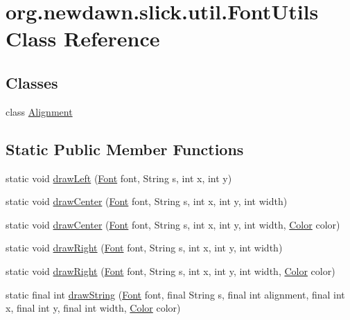 \hypertarget{classorg_1_1newdawn_1_1slick_1_1util_1_1_font_utils}{}\section{org.\+newdawn.\+slick.\+util.\+Font\+Utils Class Reference}
\label{classorg_1_1newdawn_1_1slick_1_1util_1_1_font_utils}
\subsection*{Classes}
\begin{DoxyCompactItemize}
\item 
class \mbox{\hyperlink{classorg_1_1newdawn_1_1slick_1_1util_1_1_font_utils_1_1_alignment}{Alignment}}
\end{DoxyCompactItemize}
\subsection*{Static Public Member Functions}
\begin{DoxyCompactItemize}
\item 
static void \mbox{\hyperlink{classorg_1_1newdawn_1_1slick_1_1util_1_1_font_utils_a3d08db123e5255022cc604309e93cb52}{draw\+Left}} (\mbox{\hyperlink{interfaceorg_1_1newdawn_1_1slick_1_1_font}{Font}} font, String s, int x, int y)
\item 
static void \mbox{\hyperlink{classorg_1_1newdawn_1_1slick_1_1util_1_1_font_utils_aa150b527895846f84f99c01abcac007d}{draw\+Center}} (\mbox{\hyperlink{interfaceorg_1_1newdawn_1_1slick_1_1_font}{Font}} font, String s, int x, int y, int width)
\item 
static void \mbox{\hyperlink{classorg_1_1newdawn_1_1slick_1_1util_1_1_font_utils_af6cd816a074ebf194f0a50de137d895a}{draw\+Center}} (\mbox{\hyperlink{interfaceorg_1_1newdawn_1_1slick_1_1_font}{Font}} font, String s, int x, int y, int width, \mbox{\hyperlink{classorg_1_1newdawn_1_1slick_1_1_color}{Color}} color)
\item 
static void \mbox{\hyperlink{classorg_1_1newdawn_1_1slick_1_1util_1_1_font_utils_a4d6971df637befd431907958aeb8d113}{draw\+Right}} (\mbox{\hyperlink{interfaceorg_1_1newdawn_1_1slick_1_1_font}{Font}} font, String s, int x, int y, int width)
\item 
static void \mbox{\hyperlink{classorg_1_1newdawn_1_1slick_1_1util_1_1_font_utils_ab6e4d8b69eb2529e2b1894713505b290}{draw\+Right}} (\mbox{\hyperlink{interfaceorg_1_1newdawn_1_1slick_1_1_font}{Font}} font, String s, int x, int y, int width, \mbox{\hyperlink{classorg_1_1newdawn_1_1slick_1_1_color}{Color}} color)
\item 
static final int \mbox{\hyperlink{classorg_1_1newdawn_1_1slick_1_1util_1_1_font_utils_a6c4d8812a09f7beb161c9e62ddfbd736}{draw\+String}} (\mbox{\hyperlink{interfaceorg_1_1newdawn_1_1slick_1_1_font}{Font}} font, final String s, final int alignment, final int x, final int y, final int width, \mbox{\hyperlink{classorg_1_1newdawn_1_1slick_1_1_color}{Color}} color)
\end{DoxyCompactItemize}

